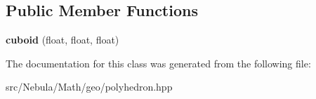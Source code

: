 \subsection*{\-Public \-Member \-Functions}
\begin{DoxyCompactItemize}
\item 
\hypertarget{classmath_1_1geo_1_1cuboid_a72bd7e6bf32ccd6928e375efa3036491}{{\bfseries cuboid} (float, float, float)}\label{classmath_1_1geo_1_1cuboid_a72bd7e6bf32ccd6928e375efa3036491}

\end{DoxyCompactItemize}


\-The documentation for this class was generated from the following file\-:\begin{DoxyCompactItemize}
\item 
src/\-Nebula/\-Math/geo/polyhedron.\-hpp\end{DoxyCompactItemize}
